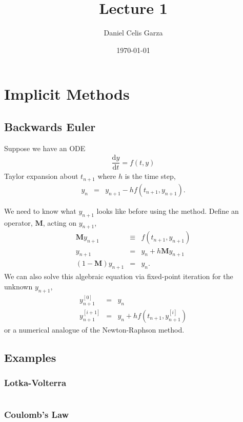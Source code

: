 \documentclass[10pt,a4paper]{article}
\begin{document}
	\title{Lecture 1}
	\author{Daniel Celis Garza}
	\date{\today}
	\maketitle
	\section{Implicit Methods}
	
	\subsection{Backwards Euler}
	Suppose we have an ODE
	\begin{eqnarray}
		\dfrac{\mathrm{d}y}{\mathrm{d}t} = f(t,y)
	\end{eqnarray}
	Taylor expansion about $t_{n+1}$ where $h$ is the time step,
	\begin{eqnarray}\label{eq:backeul}
		y_{n} &=& y_{n+1} - h f(t_{n+1},y_{n+1}).
	\end{eqnarray}
	
	We need to know what $y_{n+1}$ looks like before using the method. Define an operator, $\mathbf{M}$, acting on $y_{n+1}$,	
	\begin{eqnarray}
		\mathbf{M} y_{n+1} &\equiv& f(t_{n+1}, y_{n+1}) \\
		y_{n+1} &=& y_{n} + h \mathbf{M} y_{n+1} \\
		(1 - \mathbf{M}) y_{n+1} &=& y_{n}.
	\end{eqnarray}
	We can also solve this algebraic equation via fixed-point iteration for the unknown $y_{n+1}$,
	\begin{eqnarray}
		y_{n+1}^{[0]} &=& y_{n} \\
		y_{n+1}^{[i+1]} &=& y_{n} + h f(t_{n+1},y_{n+1}^{[i]})
	\end{eqnarray}
	or a numerical analogue of the Newton-Raphson method.
	
	\subsection{Examples}
	\subsubsection{Lotka-Volterra}
	\inputminted{python}{../python/examples.py}
	
	\subsubsection{Coulomb's Law}
	
\end{document}
